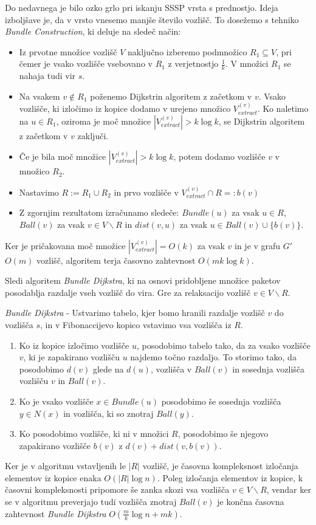 \documentclass{article}
\begin{document}
Do nedavnega je bilo ozko grlo pri iskanju SSSP vrsta s prednostjo. Ideja izboljšave je, da v vrsto vnesemo manjše število vozlišč. To dosežemo s tehniko \textit{Bundle Construction}, ki deluje na sledeč način:
\begin{itemize}
  \item Iz prvotne množice vozlišč $V$ naključno izberemo podmnožico $R_1 \subseteq V$, pri čemer je vsako vozlišče vsebovano v $R_1$ z verjetnostjo $\frac{1}{k}$. V množici $R_1$ se nahaja tudi vir $s$.
  \item Na vsakem $v \notin R_1$ poženemo Dijkstrin algoritem z začetkom v $v$.
  Vsako vozlišče, ki izločimo iz kopice dodamo v urejeno množico $V_{extract}^{(v)}$. Ko naletimo na $u \in R_1$, oziroma je moč množice $|V_{extract}^{(v)}| > k \log k$, se Dijkstrin algoritem z začetkom v $v$ zaključi.
  \item Če je bila moč množice $|V_{extract}^{(v)}| > k \log k$, potem dodamo vozlišče $v$ v množico $R_2$.
  \item Nastavimo $R := R_1 \cup R_2$ in prvo vozlišče v $V_{extract}^{(v)} \cap R =: b(v)$ 
  \item Z zgornjim rezultatom izračunamo sledeče: $Bundle(u)$ za vsak $u \in R$, $Ball(v)$ za vsak $v \in V \backslash R$ in $dist(v,u)$ za vsak $u \in Ball(v) \cup \{b(v)\}$.
\end{itemize}

Ker je pričakovana moč množice $|V_{extract}^{(v)}| = O(k)$ za vsak $v$ in je v grafu $G'$ $O(m)$ vozlišč, algoritem terja časovno zahtevnost $O(mk \log k)$.

Sledi algoritem \textit{Bundle Dijkstra}, ki na osnovi pridobljene množice paketov posodablja razdalje vseh vozlišč do vira. Gre za relaksacijo vozlišč $v \in V \backslash R$.

\textit{Bundle Dijkstra} - Ustvarimo tabelo, kjer bomo hranili razdalje vozlišč $v$ do vozlišča $s$, in v Fibonaccijevo kopico vstavimo vsa vozlišča iz $R$.
\begin{enumerate}
  \item
  Ko iz kopice izločimo vozlišče $u$, posodobimo tabelo tako, da za vsako vozlišče $v$, ki je zapakirano vozlišču $u$ najdemo točno razdaljo. To storimo tako, da posodobimo $d(v)$ glede na $d(u)$, vozlišča v $Ball(v)$ in sosednja vozlišča vozlišču $v$ in $Ball(v)$.
  \item
  Ko je vsako vozlišče $x \in Bundle(u)$ posodobimo še sosednja vozlišča $y \in N(x)$ in vozlišča, ki so znotraj $Ball(y)$.
  \item
  Ko posodobimo vozlišče, ki ni v množici $R$, posodobimo še njegovo zapakirano vozlišče $b(v)$ z $d(v) + dist(v,b(v))$.
\end{enumerate}
Ker je v algoritmu vstavljenih le $|R|$ vozlišč, je časovna kompleksnost izločanja elementov iz kopice enaka $O(|R|\log n)$. Poleg izločanja elementov iz kopice, k časovni kompleksnosti pripomore še zanka skozi vsa vozlišča ${v} \in V \backslash R$, vendar ker se v algoritmu preverjajo tudi vozlišča znotraj $Ball(v)$ je končna časovna zahtevnost \textit{Bundle Dijkstra} $O(\frac{m}{k}\log n + mk)$.
\end{document}

